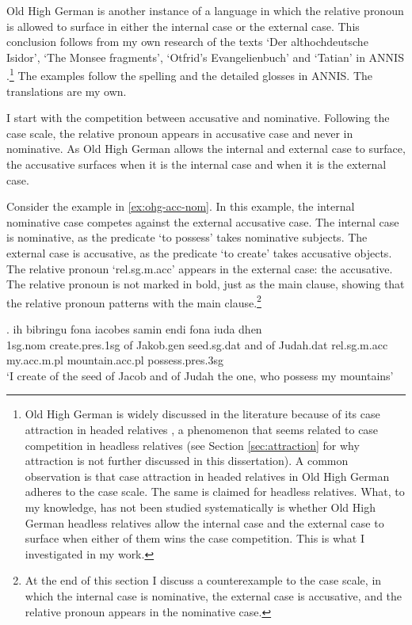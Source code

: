 Old High German is another instance of a language in which the relative pronoun is allowed to surface in either the internal case or the external case. This conclusion follows from my own research of the texts `Der althochdeutsche Isidor', `The Monsee fragments', `Otfrid's Evangelienbuch' and `Tatian' in ANNIS \citep{krause2016}.\footnote{
Old High German is widely discussed in the literature because of its case attraction in headed relatives \citep[cf.][]{pittner1995}, a phenomenon that seems related to case competition in headless relatives (see Section \ref{sec:attraction} for why attraction is not further discussed in this dissertation).
A common observation is that case attraction in headed relatives in Old High German adheres to the case scale. The same is claimed for headless relatives.
What, to my knowledge, has not been studied systematically is whether Old High German headless relatives allow the internal case and the external case to surface when either of them wins the case competition. This is what I investigated in my work.
}
The examples follow the spelling and the detailed glosses in ANNIS. The translations are my own.

I start with the competition between accusative and nominative. Following the case scale, the relative pronoun appears in accusative case and never in nominative. As Old High German allows the internal and external case to surface, the accusative surfaces when it is the internal case and when it is the external case.

Consider the example in \ref{ex:ohg-acc-nom}. In this example, the internal nominative case competes against the external accusative case.
The internal case is nominative, as the predicate  `to possess' takes nominative subjects.
The external case is accusative, as the predicate  `to create' takes accusative objects.
The relative pronoun  `\ac{rel}.\ac{sg}.\ac{m}.\ac{acc}' appears in the external case: the accusative. The relative pronoun is not marked in bold, just as the main clause, showing that the relative pronoun patterns with the main clause.\footnote{
At the end of this section I discuss a counterexample to the case scale, in which the internal case is nominative, the external case is accusative, and the relative pronoun appears in the nominative case.
}

\exg. ih bibringu fona iacobes samin endi fona iuda dhen   \\
1\ac{sg}.\ac{nom} {create}.\ac{pres}.1\ac{sg}\scsub{[acc]} of Jakob.\ac{gen} seed.\ac{sg}.\ac{dat} and of Judah.\ac{dat} \ac{rel}.\ac{sg}.\ac{m}.\ac{acc} my.\ac{acc}.\ac{m}.\ac{pl} mountain.\ac{acc}.\ac{pl} possess.\ac{pres}.3\ac{sg}\scsub{[nom]}\\
`I create of the seed of Jacob and of Judah the one, who possess my mountains' \label{ex:ohg-acc-nom}

